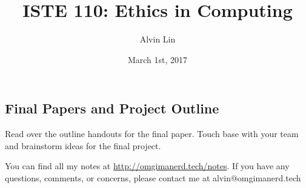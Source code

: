 \documentclass{article}
\title{ISTE 110: Ethics in Computing}
\author{Alvin Lin}
\date{March 1st, 2017}
\begin{document}
\maketitle

\subsection*{Final Papers and Project Outline}
Read over the outline handouts for the final paper.
Touch base with your team and brainstorm ideas for the final project.

\begin{center}
  You can find all my notes at \url{http://omgimanerd.tech/notes}. If you have
  any questions, comments, or concerns, please contact me at
  alvin@omgimanerd.tech
\end{center}
\end{document}
